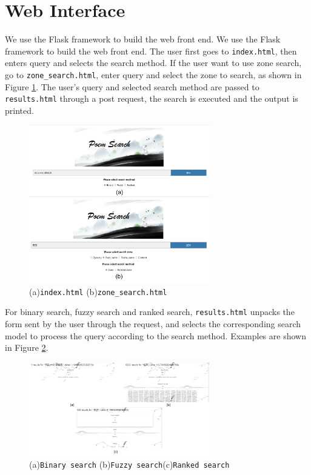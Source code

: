 \section{Web Interface} \label{sec:web}
We use the Flask framework to build the web front end. We use the Flask framework to build the web front end. The user first goes to \lstinline{index.html}, then enters query and selects the search method. If the user want to use zone search, go to \lstinline{zone_search.html}, enter query and select the zone to search, as shown in Figure \ref{search-11}. The user's query and selected search method are passed to \lstinline{results.html} through a post request, the search is executed and the output is printed.
\begin{figure}[h]
\centering
\includegraphics[width=0.7\textwidth]{figure/interface.png}
\caption{(a)\lstinline{index.html} (b)\lstinline{zone_search.html}}
\label{search-11}
\end{figure}
For binary search, fuzzy search and ranked search, \lstinline{results.html} unpacks the form sent by the user through the request, and selects the corresponding search model to process the query according to the search method. Examples are shown in Figure \ref{search-9}.
\begin{figure}[h]
\centering
\includegraphics[width=0.7\textwidth]{figure/result1.png}
\caption{(a)\lstinline{Binary search} (b)\lstinline{Fuzzy search}(c)\lstinline{Ranked search}}
\label{search-9}
\end{figure}

